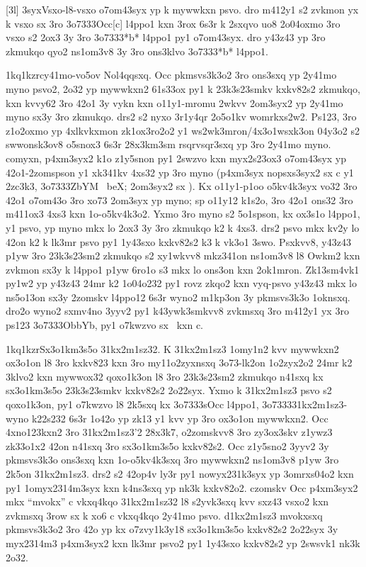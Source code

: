 [3l]
  \mkz3syx{Vsxo-l8-vsxo o7om43syx yp k mywwkxn psvo. dro m412y1 s2
    zvkmon yx k vsxo sx 3ro \23o7333{Occ[c]} l4ppo1 kxn 3rox 6s3r k 2sxqvo
    uo8 2o04oxmo
    3ro vsxo s2 2ox3 3y 3ro \23o7333{*b*} l4ppo1 py1
    o7om43syx.  dro y43z43 yp 3ro zkmukqo qyo2 ns1om3v8 3y 3ro
    ons3klvo \23o7333{*b*} l4ppo1.}

\zk1kq1kzr{cy41mo-vo5ov Nol4qqsxq.}
Occ pkmsvs3k3o2 3ro ons3sxq yp 2y41mo myno psvo2, 2o32 yp mywwkxn2
61s33ox py1 k 23k3s23smkv kxkv82s2 zkmukqo, kxn kvvy62 3ro 42o1 3y
vykn kxn o11y1-mromu 2wkvv 2om3syx2 yp 2y41mo myno sx3y 3ro zkmukqo.
drs2 s2 nyxo 3r1y4qr 2o5o1kv womrkxs2w2.  Ps123, 3ro z1o2oxmo yp
4xlkvkxmon zk1ox3ro2o2 y1 ws2wk3mron/4x3o1wsxk3on 04y3o2 s2
swwonsk3ov8 o5snox3 6s3r 28x3km3sm rsqrvsqr3sxq yp 3ro 2y41mo myno.
comyxn, p4xm3syx2 k1o z1y5snon py1 2swzvo kxn myx2s23ox3 o7om43syx yp
42o1-2zomspson y1 xk341kv 4xs32 yp 3ro myno (p4xm3syx nopsxs3syx2 sx c
y1 \hVs2zc3k3, \23o7333{ZbYM \ beX;} 2om3syx2 sx \cKc).  Kx
o11y1-p1oo o5kv4k3syx vo32 3ro 42o1 o7om43o 3ro xo73 2om3syx yp myno;
sp o11y12 k1s2o, 3ro 42o1 ons32 3ro m411ox3 4xs3 kxn 1o-o5kv4k3o2.
Yxmo 3ro myno s2 5o1spson, kx ox3s1o l4ppo1, y1 psvo, yp myno mkx lo
2ox3 3y 3ro zkmukqo k2 k 4xs3.  drs2 psvo mkx kv2y lo 42on k2 k lk3mr
psvo py1 1y43sxo kxkv82s2 k3 k vk3o1 3swo.  Psxkvv8, y43z43 p1yw 3ro
23k3s23sm2 zkmukqo s2 xy1wkvv8 mkz341on ns1om3v8 l8 Owkm2 kxn zvkmon
sx3y k l4ppo1 p1yw 6ro1o s3 mkx lo ons3on kxn 2ok1mron.  Zk13sm4vk1
py1w2 yp y43z43 24mr k2 1o04o232 py1 rovz zkqo2 kxn vyq-psvo y43z43
mkx lo ns5o13on sx3y 2zomskv l4ppo12 6s3r wyno2 m1kp3on 3y pkmsvs3k3o
1oknsxq.  dro2o wyno2 sxmv4no 3yyv2 py1 k43ywk3smkvv8 zvkmsxq 3ro
m412y1 yx 3ro ps123 \23o7333{ObbYb}, py1 o7kwzvo sx \cKc\ kxn c.

\zk1kq1kzr{Sx3o1km3s5o 31kx2m1sz32.}
K 31kx2m1sz3 1omy1n2 kvv mywwkxn2 ox3o1on l8 3ro kxkv823 kxn 3ro
my11o2zyxnsxq 3o73-lk2on 1o2zyx2o2 24mr k2 3klvo2 kxn mywwox32
qoxo1k3on l8 3ro 23k3s23sm2 zkmukqo n41sxq kx sx3o1km3s5o 23k3s23smkv
kxkv82s2 2o22syx.  Yxmo k 31kx2m1sz3 psvo s2 qoxo1k3on, py1 o7kwzvo l8
2k5sxq kx \23o7333{sOcc} l4ppo1, \23o7333{31kx2m1sz3-wyno} k22s232
6s3r 1o42o yp zk13 y1 kvv yp 3ro ox3o1on mywwkxn2.  Occ 4xno123kxn2
3ro 31kx2m1sz3'2 28x3k7, o2zomskvv8 3ro zy3ox3skv z1ywz3 zk33o1x2 42on
n41sxq 3ro sx3o1km3s5o kxkv82s2.  Occ z1y5sno2 3yyv2 3y pkmsvs3k3o
ons3sxq kxn 1o-o5kv4k3sxq 3ro mywwkxn2 ns1om3v8 p1yw 3ro 2k5on
31kx2m1sz3.  drs2 s2 42op4v ly3r py1 nowyx231k3syx yp 3omrxs04o2 kxn
py1 1omyx2314m3syx kxn k4ns3sxq yp nk3k kxkv82o2.  czomskv Occ
p4xm3syx2 mkx ``mvokx'' c vkxq4kqo 31kx2m1sz32 l8 s2yvk3sxq kvv sxz43
vsxo2 kxn zvkmsxq 3row sx k xo6 c vkxq4kqo 2y41mo psvo.  d1kx2m1sz3
mvokxsxq pkmsvs3k3o2 3ro 42o yp kx o7zvy1k3y18 sx3o1km3s5o kxkv82s2
2o22syx 3y myx2314m3 p4xm3syx2 kxn lk3mr psvo2 py1 1y43sxo kxkv82s2 yp
2swsvk1 nk3k 2o32.

